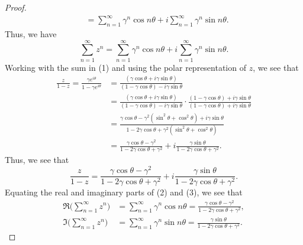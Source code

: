 \documentclass[a4paper]{article}
\begin{document}
\begin{enumerate}
\begin{proof}
\begin{align*}
                                            &= \sum_{ n=1  }^{ \infty  } \gamma^{n} \cos n \theta + i \sum_{ n=1 }^{ \infty  } \gamma^{n} \sin n \theta.  
        \end{align*}
        Thus, we have
        \[ \sum_{ n=1  }^{ \infty  } z^{n} = \sum_{ n=1  }^{ \infty  } \gamma^{n} \cos n \theta + i \sum_{ n=1  }^{ \infty  } \gamma^{n} \sin n \theta. \tag{2}    \]
        Working with the sum in (1) and using the polar representation of \( z  \), we see that
        \begin{align*}
            \frac{ z  }{  1 - z  } = \frac{ \gamma e^{i \theta} }{ 1 - \gamma e^{i \theta}  }  
                                   &= \frac{  ( \gamma \cos \theta + i \gamma \sin \theta)  }{ (1 - \gamma \cos \theta) -   i \gamma \sin \theta  }   \\
                                   &= \frac{  ( \gamma \cos \theta + i \gamma \sin \theta)  }{ (1 - \gamma \cos \theta) - i \gamma \sin \theta  } \cdot \frac{ ( 1 - \gamma \cos \theta) + i \gamma \sin \theta }{ (1 - \gamma \cos \theta ) + i \gamma \sin \theta  }    \\
                                   &= \frac{ \gamma \cos \theta - \gamma^{2}( \sin^{2} \theta + \cos^{2} \theta ) + i \gamma \sin \theta  }{  1 -  2 \gamma \cos \theta + \gamma^{2} (\sin^{2} \theta + \cos^{2} \theta ) } \\
                                   &= \frac{ \gamma \cos \theta - \gamma^{2} }{ 1 - 2 \gamma \cos \theta + \gamma^{2} } + i \frac{ \gamma \sin \theta  }{ 1 - 2 \gamma \cos \theta + \gamma^{2} }.
        \end{align*}
        Thus, we see that 
        \[  \frac{ z  }{  1 - z  }  =  \frac{ \gamma \cos \theta - \gamma^{2} }{ 1 - 2 \gamma \cos \theta + \gamma^{2} } + i \frac{ \gamma \sin \theta  }{ 1 - 2 \gamma \cos \theta + \gamma^{2} }. \tag{3}
\]
Equating the real and imaginary parts of (2) and (3), we see that
\begin{align*}
    \Re \Big(  \sum_{ n=1  }^{ \infty  } z^{n}  \Big) &= \sum_{ n=1  }^{ \infty  } \gamma^{n} \cos n \theta = \frac{ \gamma \cos \theta - \gamma^{2} }{ 1 - 2 \gamma \cos \theta + \gamma^{2} },   \\
    \Im \Big(  \sum_{ n=1  }^{ \infty  } z^{n} \Big) &= \sum_{ n=1  }^{ \infty  } \gamma^{n} \sin n \theta = \frac{ \gamma \sin \theta  }{ 1 - 2 \gamma \cos \theta + \gamma^{2} }.
\end{align*}
        \end{proof}
\end{enumerate}
\end{document}
